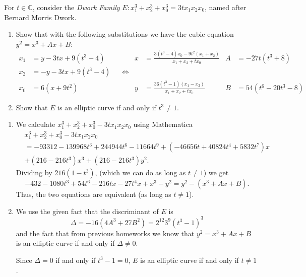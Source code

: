 \documentclass[12 pt, letterpaper]{hmcpset}
\begin{document}
\pagebreak

\begin{problem}[Problem 2.]
	For $t \in \mathbb{C}$, consider the \emph{Dwork Family} $E : x_{1}^{3} + x_{2}^{3} + x_{0}^{3} = 3 t x_{1} x_{2} x_{0}$, named after Bernard Morris Dwork.
	\begin{enumerate}
		\item Show that with the following substitutions we have the cubic equation $y^{2} = x^{3} + A x + B$:
			\begin{align*}
				x_{1} & = y - 3 t x + 9(t^{3} - 4) & & & x & = \frac{3(t^{3} - 4) x_{0} - 9 t^{2}(x_{1} + x_{2})}{x_{1} + x_{2} + t x_{0}} & A & = -27 t(t^3 + 8) \\
				x_{2} & = -y - 3 t x + 9(t^{3} - 4) & & \iff \\
				x_{0} & = 6(x + 9 t^{2}) & & & y & = \frac{36(t^{3} - 1)(x_{1} - x_{2})}{x_{1} + x_{2} + t x_{0}} & B & = 54(t^{6} - 20 t^{3} - 8)
			\end{align*}
		\item Show that $E$ is an elliptic curve if and only if $t^{3} \neq 1$.
	\end{enumerate}
\end{problem}

\begin{solution}
	\begin{enumerate}
		\item We calculate $x_{1}^{3} + x_{2}^{3} + x_{0}^{3} - 3 t x_{1} x_{2} x_{0}$ using Mathematica
			\[
				\begin{split}
					& x_{1}^{3} + x_{2}^{3} + x_{0}^{3} - 3 t x_{1} x_{2} x_{0} \\
					& = -93312 - 139968 t^{3} + 244944 t^{6} - 11664 t^{9} + (-46656 t + 40824 t^{4} + 5832 t^{7}) x \\
					& + (216 - 216 t^{3}) x^{3} + (216 - 216 t^{3}) y^{2}.
				\end{split}
			\]
			Dividing by $216(1 - t^{3})$, (which we can do as long as $t \neq 1$) we get
			\[
			-432 - 1080 t^{3} + 54 t^{6} - 216 t x - 27 t^{4} x + x^{3} - y^{2} = y^{2} - (x^{3} + A x + B).
			\]
			Thus, the two equations are equivalent (as long as $t \neq 1$).
		\item We use the given fact that the discriminant of $E$ is
			 \[
				\Delta = -16(4 A^{3} + 27 B^{2}) = 2^{12} 3^{9} (t^{3} - 1)^{3}
			\]
			and the fact that from previous homeworks we know that $y^{2} = x^{3} + A x + B$ is an elliptic curve if and only if $\Delta \neq 0$.

			Since $\Delta = 0$ if and only if $t^{3} - 1 = 0$, $E$ is an elliptic curve if and only if $t \neq 1$.
	\end{enumerate}
\end{solution}
\end{document}
